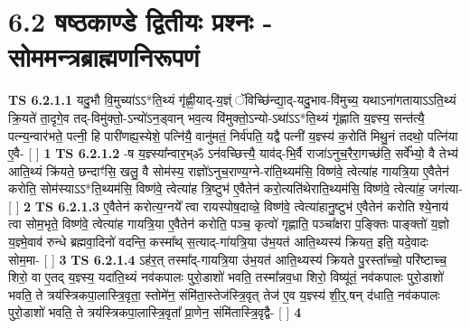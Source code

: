 \documentclass[17pt]{extarticle}
\begin{document}
     \section*{ 6.2       षष्ठकाण्डे द्वितीयः प्रश्नः - सोममन्त्रब्राह्मणनिरूपणं }
                                        \textbf{ TS 6.2.1.1} \newline
                  यदु॒भौ वि॒मुच्या॑ऽऽ*ति॒थ्यं गृ॑ह्णी॒याद्-य॒ज्ञ्ं ॅविच्छि॑न्द्या॒द्-यदु॒भाव-वि॑मुच्य॒ यथाऽना॑गतायाऽऽति॒थ्यं क्रि॒यते॑ ता॒दृगे॒व तद्-विमु॑क्तो॒-ऽन्यो॑ऽन॒ड्वान् भव॒त्य वि॑मुक्तो॒ऽन्यो-ऽथा॑ऽऽ*ति॒थ्यं गृ॑ह्णाति य॒ज्ञ्स्य॒ सन्त॑त्यै॒ पत्न्य॒न्वार॑भते॒ पत्नी॒ हि पारी॑णह्य॒स्येशे॒ पत्नि॑यै॒ वानु॑मतं॒ निर्व॑पति॒ यद्वै पत्नी॑ य॒ज्ञ्स्य॑ क॒रोति॑ मिथु॒नं तदथो॒ पत्नि॑या ए॒वै- [  ] \textbf{  1} \newline
                  \newline
                                \textbf{ TS 6.2.1.2} \newline
                  -ष य॒ज्ञ्स्या᳚न्वार॒भ्ॐ ऽन॑वच्छित्त्यै॒ याव॑द्-भि॒र्वै राजा॑ऽनुच॒रैरा॒गच्छ॑ति॒ सर्वे᳚भ्यो॒ वै तेभ्य॑ आति॒थ्यं क्रि॑यते॒ छन्दाꣳ॑सि॒ खलु॒ वै सोम॑स्य॒ राज्ञो॑ऽनुच॒राण्य॒ग्ने-रा॑ति॒थ्यम॑सि॒ विष्ण॑वे॒ त्वेत्या॑ह गायत्रि॒या ए॒वैतेन॑ करोति॒ सोम॑स्याऽऽ*ति॒थ्यम॑सि॒ विष्ण॑वे॒ त्वेत्या॑ह त्रि॒ष्टुभ॑ ए॒वैतेन॑ करो॒त्यति॑थेराति॒थ्यम॑सि॒ विष्ण॑वे॒ त्वेत्या॑ह॒ जग॑त्या- [  ] \textbf{  2} \newline
                  \newline
                                \textbf{ TS 6.2.1.3} \newline
                  ए॒वैतेन॑ करोत्य॒ग्नये᳚ त्वा रायस्पोष॒दाव्न्ने॒ विष्ण॑वे॒ त्वेत्या॑हानु॒ष्टुभ॑ ए॒वैतेन॑ करोति श्ये॒नाय॑ त्वा सोम॒भृते॒ विष्ण॑वे॒ त्वेत्या॑ह गायत्रि॒या ए॒वैतेन॑ करोति॒ पञ्च॒ कृत्वो॑ गृह्णाति॒ पञ्चा᳚क्षरा प॒ङ्क्तिः पाङ्क्तो॑ य॒ज्ञो य॒ज्ञ्मे॒वाव॑ रुन्धे ब्रह्मवा॒दिनो॑ वदन्ति॒ कस्मा᳚थ् स॒त्याद्-गा॑यत्रि॒या उ॑भ॒यत॑ आति॒थ्यस्य॑ क्रियत॒ इति॒ यदे॒वादः सोम॒मा- [  ] \textbf{  3} \newline
                  \newline
                                \textbf{ TS 6.2.1.4} \newline
                  ऽह॑र॒त् तस्मा᳚द्-गायत्रि॒या उ॑भ॒यत॑ आति॒थ्यस्य॑ क्रियते पु॒रस्ता᳚च्चो॒ परि॑ष्टाच्च॒ शिरो॒ वा ए॒तद् य॒ज्ञ्स्य॒ यदा॑ति॒थ्यं नव॑कपालः पुरो॒डाशो॑ भवति॒ तस्मा᳚न्नव॒धा शिरो॒ विष्यू॑तं॒ नव॑कपालः पुरो॒डाशो॑ भवति॒ ते त्रय॑स्त्रिकपा॒लास्त्रि॒वृता॒ स्तोमे॑न॒ संमि॑ता॒स्तेज॑स्त्रि॒वृत् तेज॑ ए॒व य॒ज्ञ्स्य॑ शी॒र्॒.षन् द॑धाति॒ नव॑कपालः पुरो॒डाशो॑ भवति॒ ते त्रय॑स्त्रिकपा॒लास्त्रि॒वृता᳚ प्रा॒णेन॒ संमि॑तास्त्रि॒वृद्वै- [  ] \textbf{  4} \newline
\end{document}
